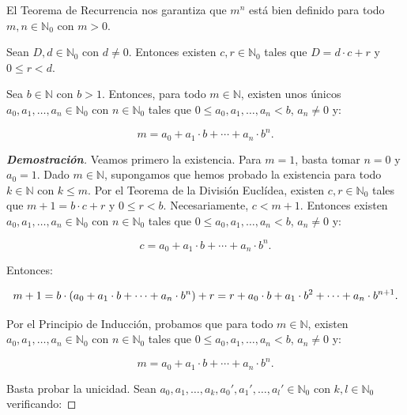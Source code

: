 El Teorema de Recurrencia nos garantiza que $m^n$ está bien definido para todo $m,n\in\mathbb{N}_0$ con $m>0$.

\begin{theorem}
  \rm Sean $D,d\in\mathbb{N}_0$ con $d\neq 0$. Entonces existen $c,r\in\mathbb{N}_0$ tales que $D=d\cdot c+r$ y $0\leq r<d$.
\end{theorem}

\begin{theorem}
  \rm Sea $b\in\mathbb{N}$ con $b>1$. Entonces, para todo $m\in\mathbb{N}$, existen unos únicos $a_0,a_1,\dots,a_n\in\mathbb{N}_0$ con $n\in\mathbb{N}_0$ tales que $0\leq a_0,a_1,\dots,a_n<b$, $a_n\neq 0$ y:

  \begin{equation}
    m=a_0+a_1\cdot b+\cdots+a_n\cdot b^n.
  \end{equation}

  \begin{proof}[\rm\textbf{Demostración}]
    \rm Veamos primero la existencia. Para $m=1$, basta tomar $n=0$ y $a_0=1$. Dado $m\in\mathbb{N}$, supongamos que hemos probado la existencia para todo $k\in\mathbb{N}$ con $k\leq m$. Por el Teorema de la División Euclídea, existen $c,r\in\mathbb{N}_0$ tales que $m+1=b\cdot c+r$ y $0\leq r<b$. Necesariamente, $c<m+1$. Entonces existen $a_0,a_1,\dots,a_n\in\mathbb{N}_0$ con $n\in\mathbb{N}_0$ tales que $0\leq a_0,a_1,\dots,a_n<b$, $a_n\neq 0$ y:

    \begin{equation}
      c=a_0+a_1\cdot b+\cdots+a_n\cdot b^n.
    \end{equation}

    Entonces:

    \begin{equation}
      m+1=b\cdot\left(a_0+a_1\cdot b+\cdots+a_n\cdot b^n\right)+r=r+a_0\cdot b+a_1\cdot b^2+\cdots+a_n\cdot b^{n+1}.
    \end{equation}

    Por el Principio de Inducción, probamos que para todo $m\in\mathbb{N}$, existen $a_0,a_1,\dots,a_n\in\mathbb{N}_0$ con $n\in\mathbb{N}_0$ tales que $0\leq a_0,a_1,\dots,a_n<b$, $a_n\neq 0$ y:

  \begin{equation}
    m=a_0+a_1\cdot b+\cdots+a_n\cdot b^n.
  \end{equation}

  Basta probar la unicidad. Sean $a_0,a_1,\dots,a_k,a_0',a_1',\dots,a_l'\in\mathbb{N}_0$ con $k,l\in\mathbb{N}_0$ verificando:
  

\end{proof}
\end{theorem}
